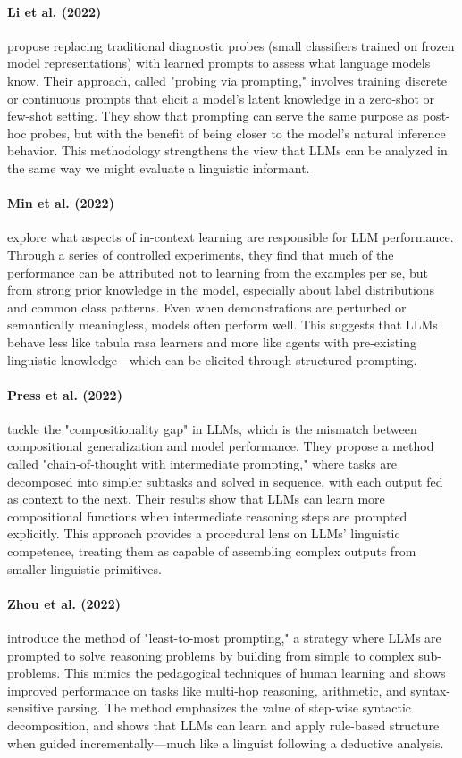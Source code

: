 \paragraph{Li et al. (2022)}
\citet{li2022probing} propose replacing traditional diagnostic probes (small classifiers trained on frozen model representations) with learned prompts to assess what language models know. Their approach, called "probing via prompting," involves training discrete or continuous prompts that elicit a model's latent knowledge in a zero-shot or few-shot setting. They show that prompting can serve the same purpose as post-hoc probes, but with the benefit of being closer to the model's natural inference behavior. This methodology strengthens the view that LLMs can be analyzed in the same way we might evaluate a linguistic informant.

\paragraph{Min et al. (2022)}
\citet{min2022rethinking} explore what aspects of in-context learning are responsible for LLM performance. Through a series of controlled experiments, they find that much of the performance can be attributed not to learning from the examples per se, but from strong prior knowledge in the model, especially about label distributions and common class patterns. Even when demonstrations are perturbed or semantically meaningless, models often perform well. This suggests that LLMs behave less like tabula rasa learners and more like agents with pre-existing linguistic knowledge---which can be elicited through structured prompting.

\paragraph{Press et al. (2022)}
\citet{press2022measuring} tackle the "compositionality gap" in LLMs, which is the mismatch between compositional generalization and model performance. They propose a method called "chain-of-thought with intermediate prompting," where tasks are decomposed into simpler subtasks and solved in sequence, with each output fed as context to the next. Their results show that LLMs can learn more compositional functions when intermediate reasoning steps are prompted explicitly. This approach provides a procedural lens on LLMs' linguistic competence, treating them as capable of assembling complex outputs from smaller linguistic primitives.

\paragraph{Zhou et al. (2022)}
\citet{zhou2022least} introduce the method of "least-to-most prompting," a strategy where LLMs are prompted to solve reasoning problems by building from simple to complex sub-problems. This mimics the pedagogical techniques of human learning and shows improved performance on tasks like multi-hop reasoning, arithmetic, and syntax-sensitive parsing. The method emphasizes the value of step-wise syntactic decomposition, and shows that LLMs can learn and apply rule-based structure when guided incrementally---much like a linguist following a deductive analysis.

